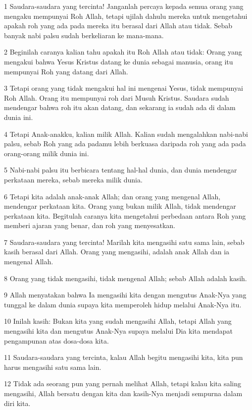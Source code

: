 \par 1 Saudara-saudara yang tercinta! Janganlah percaya kepada semua orang yang mengaku mempunyai Roh Allah, tetapi ujilah dahulu mereka untuk mengetahui apakah roh yang ada pada mereka itu berasal dari Allah atau tidak. Sebab banyak nabi palsu sudah berkeliaran ke mana-mana.
\par 2 Beginilah caranya kalian tahu apakah itu Roh Allah atau tidak: Orang yang mengakui bahwa Yesus Kristus datang ke dunia sebagai manusia, orang itu mempunyai Roh yang datang dari Allah.
\par 3 Tetapi orang yang tidak mengakui hal ini mengenai Yesus, tidak mempunyai Roh Allah. Orang itu mempunyai roh dari Musuh Kristus. Saudara sudah mendengar bahwa roh itu akan datang, dan sekarang ia sudah ada di dalam dunia ini.
\par 4 Tetapi Anak-anakku, kalian milik Allah. Kalian sudah mengalahkan nabi-nabi palsu, sebab Roh yang ada padamu lebih berkuasa daripada roh yang ada pada orang-orang milik dunia ini.
\par 5 Nabi-nabi palsu itu berbicara tentang hal-hal dunia, dan dunia mendengar perkataan mereka, sebab mereka milik dunia.
\par 6 Tetapi kita adalah anak-anak Allah; dan orang yang mengenal Allah, mendengar perkataan kita. Orang yang bukan milik Allah, tidak mendengar perkataan kita. Begitulah caranya kita mengetahui perbedaan antara Roh yang memberi ajaran yang benar, dan roh yang menyesatkan.
\par 7 Saudara-saudara yang tercinta! Marilah kita mengasihi satu sama lain, sebab kasih berasal dari Allah. Orang yang mengasihi, adalah anak Allah dan ia mengenal Allah.
\par 8 Orang yang tidak mengasihi, tidak mengenal Allah; sebab Allah adalah kasih.
\par 9 Allah menyatakan bahwa Ia mengasihi kita dengan mengutus Anak-Nya yang tunggal ke dalam dunia supaya kita memperoleh hidup melalui Anak-Nya itu.
\par 10 Inilah kasih: Bukan kita yang sudah mengasihi Allah, tetapi Allah yang mengasihi kita dan mengutus Anak-Nya supaya melalui Dia kita mendapat pengampunan atas dosa-dosa kita.
\par 11 Saudara-saudara yang tercinta, kalau Allah begitu mengasihi kita, kita pun harus mengasihi satu sama lain.
\par 12 Tidak ada seorang pun yang pernah melihat Allah, tetapi kalau kita saling mengasihi, Allah bersatu dengan kita dan kasih-Nya menjadi sempurna dalam diri kita.
